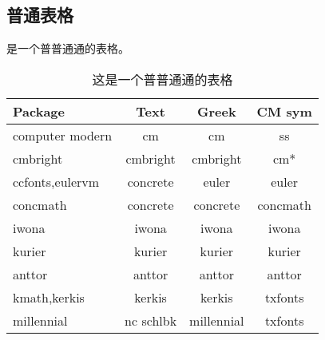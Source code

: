 \subsection{普通表格}
 是一个普普通通的表格。
\begin{table}[h]
	\centering %
	\caption{这是一个普普通通的表格}
	\begin{tabular}{lccc}
		\toprule
		Package&Text&Greek&CM sym\\
		\midrule
		computer modern&cm&cm&ss\\
		cmbright&cmbright&cmbright&cm*\\
		ccfonts,eulervm&concrete&euler&euler\\
		concmath&concrete&concrete&concmath\\
		iwona&iwona&iwona&iwona\\
		kurier&kurier&kurier&kurier\\
		anttor&anttor&anttor&anttor\\
		kmath,kerkis&kerkis&kerkis&txfonts\\
		millennial&nc schlbk&millennial&txfonts\\
		\bottomrule
	\end{tabular}
	\label{tab:commontable}
\end{table}


